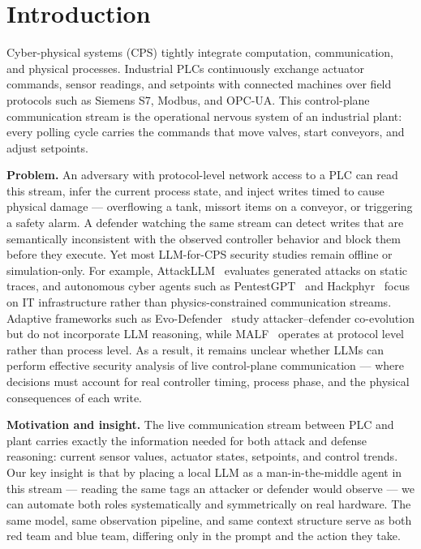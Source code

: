 \section{Introduction}

Cyber-physical systems (CPS) tightly integrate computation, communication, and physical processes. Industrial PLCs continuously exchange actuator commands, sensor readings, and setpoints with connected machines over field protocols such as Siemens S7, Modbus, and OPC-UA. This control-plane communication stream is the operational nervous system of an industrial plant: every polling cycle carries the commands that move valves, start conveyors, and adjust setpoints.

\textbf{Problem.} An adversary with protocol-level network access to a PLC can read this stream, infer the current process state, and inject writes timed to cause physical damage — overflowing a tank, missort items on a conveyor, or triggering a safety alarm. A defender watching the same stream can detect writes that are semantically inconsistent with the observed controller behavior and block them before they execute. Yet most LLM-for-CPS security studies remain offline or simulation-only. For example, AttackLLM~\cite{ahmed2025attackllm} evaluates generated attacks on static traces, and autonomous cyber agents such as PentestGPT~\cite{deng2024pentestgpt} and Hackphyr~\cite{rigaki2024hackphyr} focus on IT infrastructure rather than physics-constrained communication streams. Adaptive frameworks such as Evo-Defender~\cite{hu2025evodefender} study attacker--defender co-evolution but do not incorporate LLM reasoning, while MALF~\cite{ning2025malf} operates at protocol level rather than process level. As a result, it remains unclear whether LLMs can perform effective security analysis of live control-plane communication --- where decisions must account for real controller timing, process phase, and the physical consequences of each write.

\textbf{Motivation and insight.} The live communication stream between PLC and plant carries exactly the information needed for both attack and defense reasoning: current sensor values, actuator states, setpoints, and control trends. Our key insight is that by placing a local LLM as a man-in-the-middle agent in this stream --- reading the same tags an attacker or defender would observe --- we can automate both roles systematically and symmetrically on real hardware. The same model, same observation pipeline, and same context structure serve as both red team and blue team, differing only in the prompt and the action they take.

